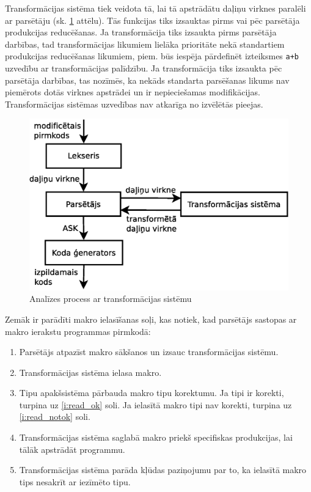 Transformācijas sistēma tiek veidota tā, lai tā apstrādātu daļiņu virknes paralēli ar parsētāju (sk. \ref{fig:ransform_compiling} attēlu). Tās funkcijas tiks izsauktas pirms vai pēc parsētāja produkcijas reducēšanas. Ja transformācija tiks izsaukta pirms parsētāja darbības, tad transformācijas likumiem lielāka prioritāte nekā standartiem produkcijas reducēšanas likumiem, piem. būs iespēja pārdefinēt izteiksmes \verb|a+b| uzvedību ar transformācijas palīdzību. Ja transformācija tiks izsaukta pēc parsētāja darbības, tas nozīmēs, ka nekāds standarta parsēšanas likums nav piemērots dotās virknes apstrādei un ir nepieciešamas modifikācijas. Transformācijas sistēmas uzvedības nav atkarīga no izvēlētās pieejas.

\begin{figure}[H]
  \centering
    \includegraphics[scale=0.4]{pictures/transform_compiling}
  \caption{\label{fig:ransform_compiling}Analīzes process ar transformācijas sistēmu}
\end{figure}

Zemāk ir parādīti makro ielasīšanas soļi, kas notiek, kad parsētājs sastopas ar makro ierakstu programmas pirmkodā:
\begin{enumerate}
\item
Parsētājs atpazīst makro sākšanos un izsauc transformācijas sistēmu.
\item
Transformācijas sistēma ielasa makro.
\item
Tipu apakšsistēma pārbauda makro tipu korektumu. Ja tipi ir korekti, turpina uz \ref{i:read_ok} soli. Ja ielasītā makro tipi nav korekti, turpina uz \ref{i:read_notok} soli.
\item \label{i:read_ok}
Transformācijas sistēma saglabā makro priekš specifiskas produkcijas, lai tālāk apstrādāt programmu.
\item \label{i:read_notok}
Transformācijas sistēma parāda kļūdas paziņojumu par to, ka ielasītā makro tips nesakrīt ar iezīmēto tipu.
\end{enumerate}

